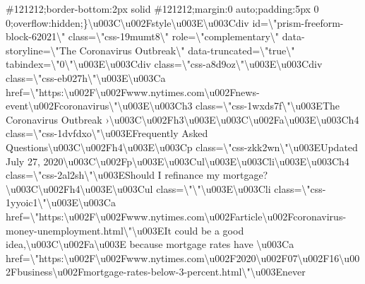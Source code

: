 \#121212;border-bottom:2px solid \#121212;margin:0 auto;padding:5px 0
0;overflow:hidden;\}\textbackslash{}u003C\textbackslash{}u002Fstyle\textbackslash{}u003E\textbackslash{}u003Cdiv
id=\textbackslash{}"prism-freeform-block-62021\textbackslash{}"
class=\textbackslash{}"css-19mumt8\textbackslash{}"
role=\textbackslash{}"complementary\textbackslash{}"
data-storyline=\textbackslash{}"The Coronavirus
Outbreak\textbackslash{}"
data-truncated=\textbackslash{}"true\textbackslash{}"
tabindex=\textbackslash{}"0\textbackslash{}"\textbackslash{}u003E\textbackslash{}u003Cdiv
class=\textbackslash{}"css-a8d9oz\textbackslash{}"\textbackslash{}u003E\textbackslash{}u003Cdiv
class=\textbackslash{}"css-eb027h\textbackslash{}"\textbackslash{}u003E\textbackslash{}u003Ca
href=\textbackslash{}"https:\textbackslash{}u002F\textbackslash{}u002Fwww.nytimes.com\textbackslash{}u002Fnews-event\textbackslash{}u002Fcoronavirus\textbackslash{}"\textbackslash{}u003E\textbackslash{}u003Ch3
class=\textbackslash{}"css-1wxds7f\textbackslash{}"\textbackslash{}u003EThe
Coronavirus Outbreak
›\textbackslash{}u003C\textbackslash{}u002Fh3\textbackslash{}u003E\textbackslash{}u003C\textbackslash{}u002Fa\textbackslash{}u003E\textbackslash{}u003Ch4
class=\textbackslash{}"css-1dvfdxo\textbackslash{}"\textbackslash{}u003EFrequently
Asked
Questions\textbackslash{}u003C\textbackslash{}u002Fh4\textbackslash{}u003E\textbackslash{}u003Cp
class=\textbackslash{}"css-zkk2wn\textbackslash{}"\textbackslash{}u003EUpdated
July 27,
2020\textbackslash{}u003C\textbackslash{}u002Fp\textbackslash{}u003E\textbackslash{}u003Cul\textbackslash{}u003E\textbackslash{}u003Cli\textbackslash{}u003E\textbackslash{}u003Ch4
class=\textbackslash{}"css-2al2sh\textbackslash{}"\textbackslash{}u003EShould
I refinance my
mortgage?\textbackslash{}u003C\textbackslash{}u002Fh4\textbackslash{}u003E\textbackslash{}u003Cul
class=\textbackslash{}"\textbackslash{}"\textbackslash{}u003E\textbackslash{}u003Cli
class=\textbackslash{}"css-1yyoic1\textbackslash{}"\textbackslash{}u003E\textbackslash{}u003Ca
href=\textbackslash{}"https:\textbackslash{}u002F\textbackslash{}u002Fwww.nytimes.com\textbackslash{}u002Farticle\textbackslash{}u002Fcoronavirus-money-unemployment.html\textbackslash{}"\textbackslash{}u003EIt
could be a good
idea,\textbackslash{}u003C\textbackslash{}u002Fa\textbackslash{}u003E
because mortgage rates have \textbackslash{}u003Ca
href=\textbackslash{}"https:\textbackslash{}u002F\textbackslash{}u002Fwww.nytimes.com\textbackslash{}u002F2020\textbackslash{}u002F07\textbackslash{}u002F16\textbackslash{}u002Fbusiness\textbackslash{}u002Fmortgage-rates-below-3-percent.html\textbackslash{}"\textbackslash{}u003Enever
